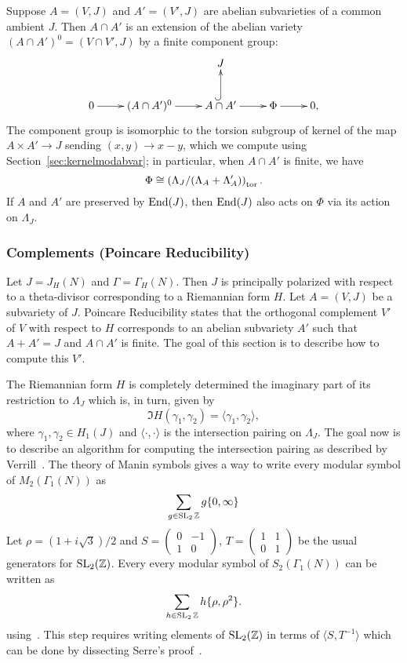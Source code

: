 \documentclass{article}
\begin{document}
Suppose $A = (V,J)$ and $A' = (V', J)$ are abelian subvarieties of a
common ambient $J$.  Then $A\cap A'$ is an extension of the abelian
variety $(A\cap A')^0 = (V\cap V', J)$ by a finite component group:
$$
\xymatrix{
    & & J & & \\
    0\ar[r]& (A\cap A')^0 \ar[r]&  A\cap A'\ar@{^(->}[u] \ar[r]& \Phi\ar[r] & 0,
}
$$
The component group is isomorphic to the torsion subgroup of kernel of
the map $A \times A' \to J$ sending $(x,y)\to x-y$, which we compute
using Section~\ref{sec:kernelmodabvar}; in particular, when $A\cap A'$ is
finite, we have
$$
\Phi \cong \left( \Lambda_J/(\Lambda_A + \Lambda_A')\right)_{\operatorname{tor}}.
$$
If $A$ and $A'$ are preserved by $\operatorname{End}(J)$, then $\operatorname{End}(J)$ also
acts on $\Phi$ via its action on $\Lambda_J$.


\subsubsection{Complements (Poincare Reducibility)}
\label{sec:poincare}

Let $J=J_H(N)$ and $\Gamma=\Gamma_H(N)$. Then $J$ is principally polarized with
respect to a theta-divisor corresponding to a Riemannian form $H$. Let $A=(V,
J)$ be a subvariety of $J$. Poincare Reducibility states that the orthogonal
complement $V'$ of $V$ with respect to $H$ corresponds to an abelian subvariety
$A'$ such that $A+A'=J$ and $A\cap A'$ is finite. The goal of this section is
to describe how to compute this $V'$.

The Riemannian form $H$ is completely determined the imaginary part of its
restriction to $\Lambda_J$ which is, in turn, given by
\[
    \Im H(\gamma_1, \gamma_2) = \langle \gamma_1, \gamma_2 \rangle,
\]
where $\gamma_1, \gamma_2\in H_1(J)$ and $\langle \cdot,\cdot \rangle$ is the
intersection pairing on $\Lambda_J$. The goal now is to describe an algorithm
for computing the intersection pairing as described by Verrill~\cite[\S
4]{verrill:intersection}. The theory of Manin symbols gives a way to write
every modular symbol of $M_2(\Gamma_1(N))$ as
\[
    \sum_{g\in \operatorname{SL}_2{\mathbb{Z}}} g\{0, \infty\}
\]
Let $\rho=(1+i\sqrt{3})/2$ and
$S = \left(
    \begin{smallmatrix}
        0 & -1 \\
        1 & 0
    \end{smallmatrix}
\right)$,
$T = \left(
    \begin{smallmatrix}
        1 & 1 \\
        0 & 1
    \end{smallmatrix}
\right)$ be the usual generators for $\operatorname{SL}_2(\mathbb{Z})$.
Every every modular symbol of $S_2(\Gamma_1(N))$ can be written as
\[
    \sum_{h\in \operatorname{SL}_2{\mathbb{Z}}} h\{\rho, \rho^2\}.
\]
using~\cite[Corollary 4.1]{verrill:intersection}. This step requires writing
elements of $\operatorname{SL}_2(\mathbb{Z})$ in terms of $ \langle S, T^{-1} \rangle$ which can be
done by dissecting Serre's proof~\cite[Chapter 7, Theorem 2]{MR0344216}.
\end{document}
